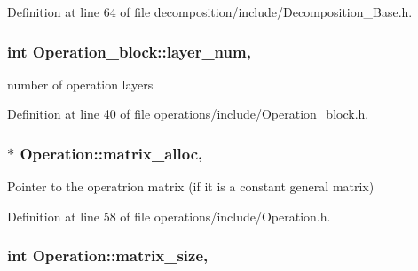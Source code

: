 Definition at line 64 of file decomposition/include/\+Decomposition\+\_\+\+Base.\+h.

\subsubsection[{\texorpdfstring{layer\+\_\+num}{layer_num}}]{\setlength{\rightskip}{0pt plus 5cm}int Operation\+\_\+block\+::layer\+\_\+num\hspace{0.3cm}{\ttfamily [protected]}, {\ttfamily [inherited]}}\hypertarget{class_operation__block_a907101b9a80e6ebeaa96cc7b973cf413}{}\label{class_operation__block_a907101b9a80e6ebeaa96cc7b973cf413}


number of operation layers 



Definition at line 40 of file operations/include/\+Operation\+\_\+block.\+h.

\subsubsection[{\texorpdfstring{matrix\+\_\+alloc}{matrix_alloc}}]{ $\ast$ Operation\+::matrix\+\_\+alloc\hspace{0.3cm}{\ttfamily [protected]}, {\ttfamily [inherited]}}\hypertarget{class_operation_ade4d28d271ca13950d04363aac1c382e}{}\label{class_operation_ade4d28d271ca13950d04363aac1c382e}


Pointer to the operatrion matrix (if it is a constant general matrix) 



Definition at line 58 of file operations/include/\+Operation.\+h.

\subsubsection[{\texorpdfstring{matrix\+\_\+size}{matrix_size}}]{\setlength{\rightskip}{0pt plus 5cm}int Operation\+::matrix\+\_\+size\hspace{0.3cm}{\ttfamily [protected]}, {\ttfamily [inherited]}}\hypertarget{class_operation_a8236c07112cb165a00d3869363808624}{}\label{class_operation_a8236c07112cb165a00d3869363808624}



